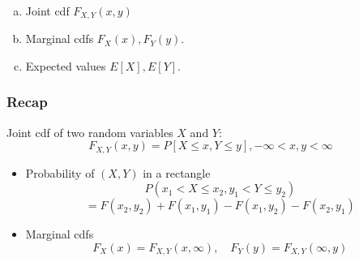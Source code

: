 \documentclass[slidestop,compress,mathserif]{beamer}
\begin{document}
\begin{frame}\frametitle{}

\begin{enumerate}[(a)]
\item Joint cdf $F_{X, Y}(x, y)$
\item Marginal cdfs $F_X(x), F_Y(y)$.
\item Expected values $E[X], E[Y]$.
\end{enumerate}

\end{frame}


\begin{frame}\frametitle{Recap}

Joint cdf of two random variables $X$ and $Y$:
\[ F_{X, Y}(x,y) = P[ X \leq x, Y \leq y ], -\infty < x, y < \infty \]
\begin{itemize}
\item Probability of $(X, Y)$ in a rectangle
\[P(x_1 < X \leq x_2, y_1 < Y \leq y_2)\]\[ = F(x_2, y_2) + F(x_1, y_1) - F(x_1, y_2) - F(x_2, y_1)\]
\item Marginal cdfs
\[ F_X(x) = F_{X, Y}(x, \infty), \quad F_Y(y) =  F_{X, Y}(\infty, y)\]
\end{itemize}

\end{frame}
\end{document}
